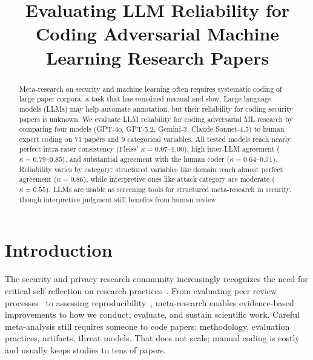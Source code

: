 \documentclass[conference,compsoc]{IEEEtran}
\begin{document}
\title{Evaluating LLM Reliability for Coding Adversarial Machine Learning Research Papers}

\author{
\and
{}
\and
{}
}

\maketitle

\begin{abstract}
Meta-research on security and machine learning often requires systematic coding of large paper corpora, a task that has remained manual and slow. Large language models (LLMs) may help automate annotation, but their reliability for coding security papers is unknown. We evaluate LLM reliability for coding adversarial ML research by comparing four models (GPT-4o, GPT-5.2, Gemini-3, Claude Sonnet-4.5) to human expert coding on 71 papers and 9 categorical variables. All tested models reach nearly perfect intra-rater consistency (Fleiss' $\kappa = 0.97$--$1.00$), high inter-LLM agreement ($\kappa = 0.79$--$0.85$), and substantial agreement with the human coder ($\kappa = 0.64$--$0.71$). Reliability varies by category: structured variables like domain reach almost perfect agreement ($\kappa = 0.86$), while interpretive ones like attack category are moderate ($\kappa = 0.55$). LLMs are usable as screening tools for structured meta-research in security, though interpretive judgment still benefits from human review.
\end{abstract}

\section{Introduction}

The security and privacy research community increasingly recognizes the need for critical self-reflection on research practices~\cite{metacrisp2026,rossow2012prudent,baset2019analyzing}. From evaluating peer review processes~\cite{soneji2024reflecting} to assessing reproducibility~\cite{olszewski2023reproducibility}, meta-research enables evidence-based improvements to how we conduct, evaluate, and sustain scientific work. Careful meta-analysis still requires someone to code papers: methodology, evaluation practices, artifacts, threat models. That does not scale; manual coding is costly and usually keeps studies to tens of papers.
\end{document}
